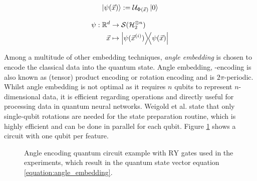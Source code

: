\begin{equation} 
    \centering
    \begin{split}
        \ket{\psi(\vec{x})} := \mathcal{U}_{\Phi(\Vec{x})}\ket{0}
    \end{split}
    \label{equation:vqa_embedding_state}
\end{equation}

\begin{equation}
    \centering
    \begin{split}
        \psi: \mathbb{R}^d & \rightarrow \mathcal{S}(\mathcal{H}_2^{\otimes n}) \\
        \vec{x} & \mapsto \op{\psi(\vec{x}^{(i)})}{\psi(\vec{x})}
    \end{split}
    \label{equation:vqa_feature_map}
\end{equation}

Among a multitude of other embedding techniques\cite{schuld_SQMLmodelsAreKernelMethods}, \emph{angle embedding} is chosen to encode the classical data into the quantum state. Angle embedding, -encoding is also known as (tensor) product encoding or rotation encoding and is $2\pi$-periodic. Whilst angle embedding is not optimal as it requires $n$ qubits to represent $n$-dimensional data, it is efficient regarding operations and directly useful for processing data in quantum neural networks\cite{leymannBitterTruthGatebased2020}. Weigold et al.\cite{Weigold2021_EncodingPatternsForQuantumAlgorithms} state that only single-qubit rotations are needed for the state preparation routine, which is highly efficient and can be done in parallel for each qubit. Figure \ref{fig:qnn_feature_encoding} shows a circuit with one qubit per feature.

\begin{figure}[!h]
    \centering
    \caption{Angle encoding quantum circuit example with $\mathrm{RY}$ gates used in the experiments, which result in the quantum state vector equation \ref{equation:angle_embedding}.}
    \label{fig:qnn_feature_encoding}
\end{figure}

